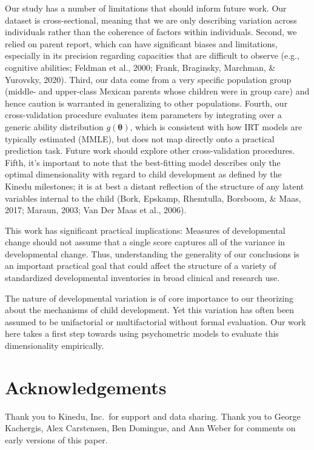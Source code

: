 \documentclass[10pt, letterpaper]{article}
\begin{document}
Our study has a number of limitations that should inform future work.
Our dataset is cross-sectional, meaning that we are only describing
variation across individuals rather than the coherence of factors within
individuals. Second, we relied on parent report, which can have
significant biases and limitations, especially in its precision
regarding capacities that are difficult to observe (e.g., cognitive
abilities; Feldman et al., 2000; Frank, Braginsky, Marchman, \&
Yurovsky, 2020). Third, our data come from a very specific population
group (middle- and upper-class Mexican parents whose children were in
group care) and hence caution is warranted in generalizing to other
populations. Fourth, our cross-validation procedure evaluates item
parameters by integrating over a generic ability distribution
\(g(\boldsymbol{\theta})\), which is consistent with how IRT models are
typically estimated (MMLE), but does not map directly onto a practical
prediction task. Future work should explore other cross-validation
procedures. Fifth, it's important to note that the best-fitting model
describes only the optimal dimensionality with regard to child
development as defined by the Kinedu milestones; it is at best a distant
reflection of the structure of any latent variables internal to the
child (Bork, Epskamp, Rhemtulla, Borsboom, \& Maas, 2017; Maraun, 2003;
Van Der Maas et al., 2006).

This work has significant practical implications: Measures of
developmental change should not assume that a single score captures all
of the variance in developmental change. Thus, understanding the
generality of our conclusions is an important practical goal that could
affect the structure of a variety of standardized developmental
inventories in broad clinical and research use.

The nature of developmental variation is of core importance to our
theorizing about the mechanisms of child development. Yet this variation
has often been assumed to be unifactorial or multifactorial without
formal evaluation. Our work here takes a first step towards using
psychometric models to evaluate this dimensionality empirically.

\hypertarget{acknowledgements}{%
\section{Acknowledgements}\label{acknowledgements}}

Thank you to Kinedu, Inc.~for support and data sharing. Thank you to
George Kachergis, Alex Carstensen, Ben Domingue, and Ann Weber for
comments on early versions of this paper.
\end{document}
